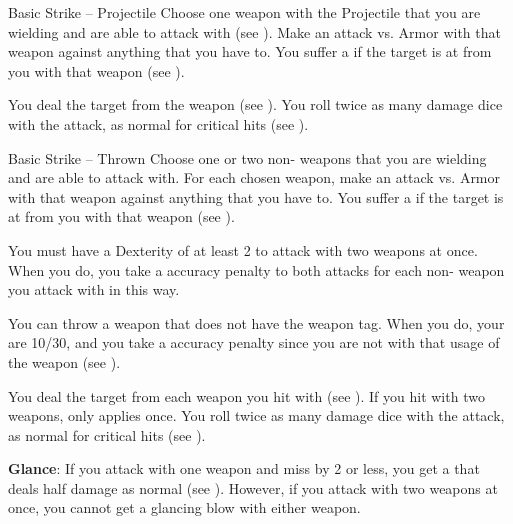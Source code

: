        \begin{activeability}{Basic Strike -- Projectile}
            \label{Projectile Strike}
            \rankline
            Choose one weapon with the Projectile  that you are wielding and are able to attack with (see ).
            Make an attack vs. Armor with that weapon against anything that you have  to.
            You suffer a  if the target is at  from you with that weapon (see ).

            \hit You deal the target  from the weapon (see ).
            \crit You roll twice as many damage dice with the attack, as normal for critical hits (see ).
        \end{activeability}

        \begin{activeability}{Basic Strike -- Thrown}
            \label{Thrown Strike}
            \rankline
            Choose one or two non- weapons that you are wielding and are able to attack with.
            For each chosen weapon, make an attack vs. Armor with that weapon against anything that you have  to.
            You suffer a  if the target is at  from you with that weapon (see ).

            You must have a Dexterity of at least 2 to attack with two weapons at once.
            When you do, you take a  accuracy penalty to both attacks for each non- weapon you attack with in this way.

            You can throw a weapon that does not have the  weapon tag.
            When you do, your  are 10/30, and you take a  accuracy penalty since you are not  with that usage of the weapon (see ).

            \hit You deal the target  from each weapon you hit with (see ).
            If you hit with two weapons,  only applies once.
            \crit You roll twice as many damage dice with the attack, as normal for critical hits (see ).
            \par \textbf{Glance}: If you attack with one weapon and miss by 2 or less, you get a  that deals half damage as normal (see ).
            However, if you attack with two weapons at once, you cannot get a glancing blow with either weapon.
        \end{activeability}

